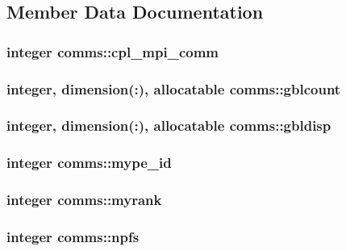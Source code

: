 \subsection{Member Data Documentation}
\hypertarget{classcomms_a9a38af536275f02674f67d814566ef67}{
\subsubsection[{cpl\-\_\-mpi\-\_\-comm}]{\setlength{\rightskip}{0pt plus 5cm}integer comms\-::cpl\-\_\-mpi\-\_\-comm}}\label{classcomms_a9a38af536275f02674f67d814566ef67}
\hypertarget{classcomms_a4912d43983e564849625e5588af33348}{
\subsubsection[{gblcount}]{\setlength{\rightskip}{0pt plus 5cm}integer, dimension(\-:), allocatable comms\-::gblcount}}\label{classcomms_a4912d43983e564849625e5588af33348}
\hypertarget{classcomms_a7b71c5edbea32c7dae3333cb1c05f3fe}{
\subsubsection[{gbldisp}]{\setlength{\rightskip}{0pt plus 5cm}integer, dimension(\-:), allocatable comms\-::gbldisp}}\label{classcomms_a7b71c5edbea32c7dae3333cb1c05f3fe}
\hypertarget{classcomms_adcd9567cc8bd6f78dc184ff3bd433eb8}{
\subsubsection[{mype\-\_\-id}]{\setlength{\rightskip}{0pt plus 5cm}integer comms\-::mype\-\_\-id}}\label{classcomms_adcd9567cc8bd6f78dc184ff3bd433eb8}
\hypertarget{classcomms_a0dead85d30852fd43b3667663c98695c}{
\subsubsection[{myrank}]{\setlength{\rightskip}{0pt plus 5cm}integer comms\-::myrank}}\label{classcomms_a0dead85d30852fd43b3667663c98695c}
\hypertarget{classcomms_a0120cad068b402a882222d566d18790e}{
\subsubsection[{npfs}]{\setlength{\rightskip}{0pt plus 5cm}integer comms\-::npfs}}\label{classcomms_a0120cad068b402a882222d566d18790e}
